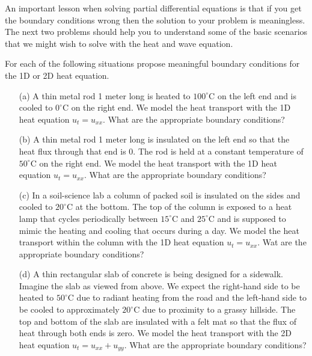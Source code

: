 An important lesson when solving partial differential equations is that if you get the
boundary conditions wrong then the solution to your problem is meaningless.  The next two
problems should help you to understand some of the basic scenarios that we might wish to
solve with the heat and wave equation. 
\begin{problem}\label{prob:heat_bc}
    For each of the following situations propose meaningful boundary conditions for the 1D
    or 2D heat equation.
    \begin{enumerate}
        \item[(a)] A thin metal rod 1 meter long is heated to $100^\circ$C on the left end and is
            cooled to $0^\circ$C on the right end.  We model the heat transport with the
            1D heat equation $u_t = u_{xx}$.  What are the appropriate boundary
            conditions?
        \item[(b)] A thin metal rod 1 meter long is insulated on the left end so that the
            heat flux through that end is 0.  The rod is held at a constant temperature of
            $50^\circ$C on the right end.  We model the heat transport with the
            1D heat equation $u_t = u_{xx}$.  What are the appropriate boundary
            conditions?
        \item[(c)] In a soil-science lab a column of packed soil is insulated on the sides
            and cooled to $20^\circ$C at the bottom.  The top of the column is exposed to
            a heat lamp that cycles periodically between $15^\circ$C and $25^\circ$C and is supposed to mimic the heating and cooling that occurs
            during a day.  We model the heat transport within the column with the 1D heat
            equation $u_t = u_{xx}$.  Wat are the appropriate boundary conditions?
        \item[(d)] A thin rectangular slab of concrete is being designed for a sidewalk.
            Imagine the slab as viewed from above.  We expect
            the right-hand side to be heated to $50^\circ$C due to radiant heating from
            the road and the left-hand side to be cooled to approximately $20^\circ$C due to
            proximity to a grassy hillside.  The top and bottom of the slab are insulated
            with a felt mat so that the flux of heat through both ends is zero.  We model
            the heat transport with the 2D heat equation $u_t = u_{xx} + u_{yy}$.  What
            are the appropriate boundary conditions?
    \end{enumerate}
\end{problem}

